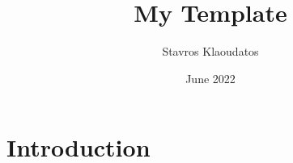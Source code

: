 \documentclass{article}
\title{My Template}
\author{Stavros Klaoudatos}
\date{June 2022}
\begin{document}
\maketitle

\section{Introduction}
\end{document}

